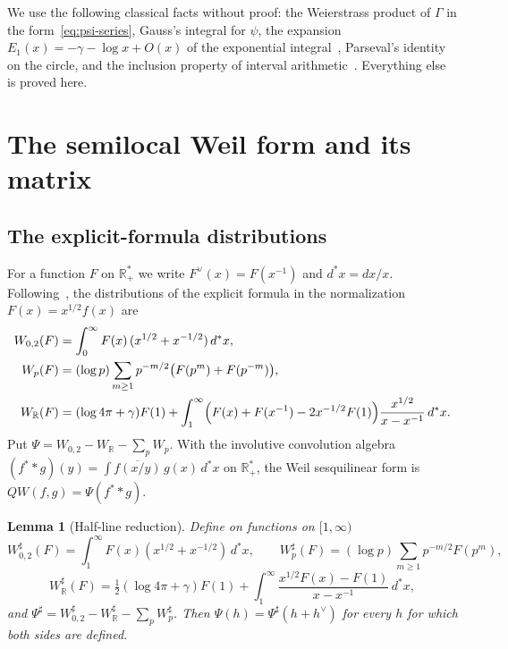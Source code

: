 \documentclass[11pt,a4paper]{article}
\newtheorem{lemma}[theorem]{Lemma}
\theoremstyle{definition}
\newcommand{\R}{\mathbb{R}}
\begin{document}
We use the following classical facts without proof: the Weierstrass
product of $\Gamma$ in the form~\eqref{eq:psi-series}, Gauss's integral for
$\psi$, the expansion $E_1(x)=-\gamma-\log x+O(x)$ of the exponential
integral~\cite[5.7.6, 5.9.16, 6.6.2]{DLMF}, Parseval's identity on the
circle, and the inclusion property of interval arithmetic~\cite{Johansson2017,Rump2010}.
Everything else is proved here.

\section{The semilocal Weil form and its matrix}\label{sec:matrix}

\subsection{The explicit-formula distributions}
For a function $F$ on $\R_+^{*}$ we write $F^{\vee}(x)=F(x^{-1})$ and
$d^{*}x=dx/x$. Following~\cite{Weil1952,CCM2025}, the distributions of the
explicit formula in the normalization $F(x)=x^{1/2}f(x)$ are
\begin{align}
W_{0,2}(F)&=\int_0^\infty F(x)\,(x^{1/2}+x^{-1/2})\,d^{*}x,\label{eq:W02}\\
W_p(F)&=(\log p)\sum_{m\ge1}p^{-m/2}\bigl(F(p^m)+F(p^{-m})\bigr),\label{eq:Wp}\\
W_\R(F)&=(\log4\pi+\gamma)F(1)+\int_1^\infty\Bigl(F(x)+F(x^{-1})-2x^{-1/2}F(1)\Bigr)\frac{x^{1/2}}{x-x^{-1}}\,d^{*}x.\label{eq:WR}
\end{align}
Put $\Psi=W_{0,2}-W_\R-\sum_pW_p$. With the involutive convolution algebra
$(f^{*}*g)(y)=\int\overline{f(x/y)}\,g(x)\,d^{*}x$ on $\R_+^{*}$, the Weil
sesquilinear form is $QW(f,g)=\Psi(f^{*}*g)$.

\begin{lemma}[Half-line reduction]\label{lem:halfline}
Define on functions on $[1,\infty)$
\[
W_{0,2}^{\sharp}(F)=\int_1^\infty F(x)(x^{1/2}+x^{-1/2})\,d^{*}x,\qquad
W_p^{\sharp}(F)=(\log p)\sum_{m\ge1}p^{-m/2}F(p^m),
\]
\[
W_\R^{\sharp}(F)=\tfrac12(\log4\pi+\gamma)F(1)+\int_1^\infty\frac{x^{1/2}F(x)-F(1)}{x-x^{-1}}\,d^{*}x,
\]
and $\Psi^{\sharp}=W_{0,2}^{\sharp}-W_\R^{\sharp}-\sum_pW_p^{\sharp}$. Then
$\Psi(h)=\Psi^{\sharp}(h+h^{\vee})$ for every $h$ for which both sides are
defined.
\end{lemma}
\end{document}
